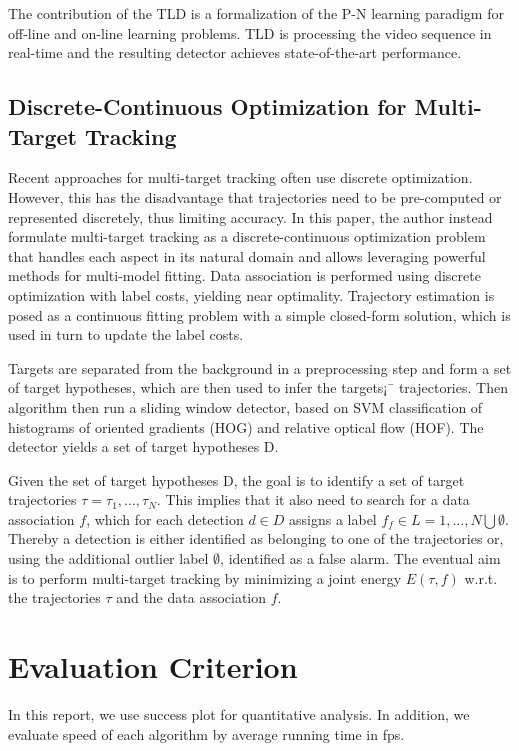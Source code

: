 \documentclass{acm_proc_article-sp}
\begin{document}
The contribution of the TLD is a formalization of the P-N learning paradigm for off-line and on-line learning problems. TLD is processing the video sequence in real-time and the resulting detector achieves state-of-the-art performance.

\subsection{Discrete-Continuous Optimization for Multi-Target Tracking}
Recent approaches for multi-target tracking often use discrete optimization. However, this has the disadvantage that trajectories need to be pre-computed or represented discretely, thus limiting accuracy. In this paper, the author instead formulate multi-target tracking as a discrete-continuous optimization problem that handles each aspect in its natural domain and allows leveraging powerful methods for multi-model fitting. Data association is performed using discrete optimization with label costs, yielding near optimality. Trajectory estimation is posed as a continuous fitting problem with a simple closed-form solution, which is used in turn to update the label costs.

Targets are separated from the background in a preprocessing step and form a set of target hypotheses, which are then used to infer the targets¡¯ trajectories. Then algorithm then run a sliding window detector, based on SVM classification of histograms of oriented gradients (HOG) and relative optical flow (HOF). The detector yields a set of target hypotheses D.

Given the set of target hypotheses D, the goal is to identify a set of target trajectories $\tau = {\tau_1,\ldots,\tau_N}$. This implies that it also need to search for a data association $f$, which for each detection $d \in D$ assigns a label $f_f \in L = {1,\ldots,N}\bigcup \emptyset$. Thereby a detection is either identified as belonging to one of the trajectories or, using the additional outlier label $\emptyset$, identified as a false alarm.
The eventual aim is to perform multi-target tracking by minimizing a joint energy $E(\tau , f)$ w.r.t. the trajectories $\tau$ and the data association $f$. 


\section{Evaluation Criterion}

In this report, we use success plot for quantitative analysis.
In addition, we evaluate speed of each algorithm by average running time in fps.
\end{document}
